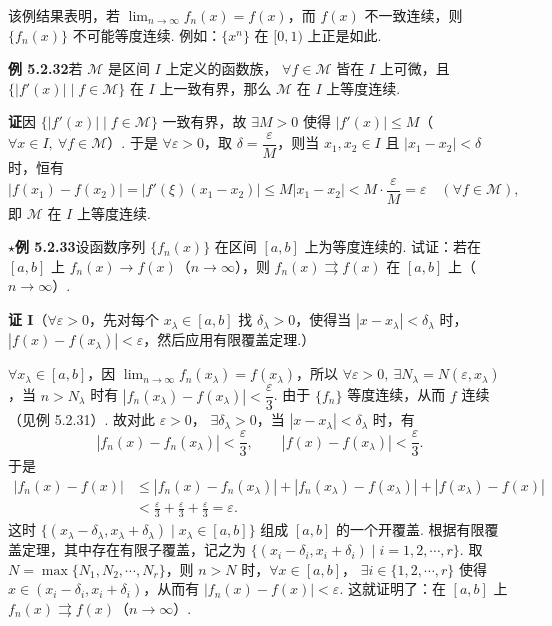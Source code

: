 \documentclass[UTF8,12pt,a4paper,fontset=fandol]{ctexart}
\begin{document}
该例结果表明，若 $\displaystyle\lim_{n\to\infty}f_n(x)=f(x)$，而 $f(x)$ 不一致连续，则
$\{f_n(x)\}$ 不可能等度连续. 例如：$\{x^n\}$ 在 $[0,1)$ 上正是如此.

\noindent\textbf{例 5.2.32}\quad 若 $\mathcal M$ 是区间 $I$ 上定义的函数族，
$\forall f\in\mathcal M$ 皆在 $I$ 上可微，且
$\{|f'(x)|\mid f\in\mathcal M\}$ 在 $I$ 上一致有界，那么 $\mathcal M$ 在 $I$ 上等度连续.

\noindent\textbf{证}\quad 因 $\{|f'(x)|\mid f\in\mathcal M\}$ 一致有界，故
$\exists M>0$ 使得 $|f'(x)|\le M$（$\forall x\in I,\ \forall f\in\mathcal M$）. 于是
$\forall\varepsilon>0$，取 $\delta=\dfrac\varepsilon M$，则当
$x_1,x_2\in I$ 且 $|x_1-x_2|<\delta$ 时，恒有
\[
  |f(x_1)-f(x_2)|=|f'(\xi)(x_1-x_2)|
  \le M|x_1-x_2|<M\cdot\frac\varepsilon M=\varepsilon\quad(\forall f\in\mathcal M),
\]
即 $\mathcal M$ 在 $I$ 上等度连续.

\noindent\textbf{$\star$例 5.2.33}\quad 设函数序列 $\{f_n(x)\}$ 在区间 $[a,b]$ 上为等度连续的. 试证：若在
$[a,b]$ 上 $f_n(x)\to f(x)$（$n\to\infty$），则
$f_n(x)\rightrightarrows f(x)$ 在 $[a,b]$ 上（$n\to\infty$）.

\noindent\textbf{证 I}\quad （$\forall\varepsilon>0$，先对每个 $x_\lambda\in[a,b]$ 找
$\delta_\lambda>0$，使得当 $|x-x_\lambda|<\delta_\lambda$ 时，
$|f(x)-f(x_\lambda)|<\varepsilon$，然后应用有限覆盖定理.）

$\forall x_\lambda\in[a,b]$，因 $\displaystyle\lim_{n\to\infty}f_n(x_\lambda)=f(x_\lambda)$，所以
$\forall\varepsilon>0,\ \exists N_\lambda=N(\varepsilon,x_\lambda)$，当
$n>N_\lambda$ 时有 $|f_n(x_\lambda)-f(x_\lambda)|<\dfrac\varepsilon3$. 由于
$\{f_n\}$ 等度连续，从而 $f$ 连续（见例 5.2.31）. 故对此 $\varepsilon>0$，
$\exists\delta_\lambda>0$，当 $|x-x_\lambda|<\delta_\lambda$ 时，有
\[
  |f_n(x)-f_n(x_\lambda)|<\frac\varepsilon3,\qquad
  |f(x)-f(x_\lambda)|<\frac\varepsilon3.
\]
于是
\[
\begin{aligned}
  |f_n(x)-f(x)|
  &\le |f_n(x)-f_n(x_\lambda)|
    +|f_n(x_\lambda)-f(x_\lambda)|+|f(x_\lambda)-f(x)|\\
  &<\frac\varepsilon3+\frac\varepsilon3+\frac\varepsilon3=\varepsilon.
\end{aligned}
\]
这时 $\{(x_\lambda-\delta_\lambda,x_\lambda+\delta_\lambda)\mid x_\lambda\in[a,b]\}$
组成 $[a,b]$ 的一个开覆盖. 根据有限覆盖定理，其中存在有限子覆盖，记之为
$\{(x_i-\delta_i,x_i+\delta_i)\mid i=1,2,\cdots,r\}$. 取
$N=\max\{N_1,N_2,\cdots,N_r\}$，则 $n>N$ 时，$\forall x\in[a,b]$，
$\exists i\in\{1,2,\cdots,r\}$ 使得 $x\in(x_i-\delta_i,x_i+\delta_i)$，从而有
$|f_n(x)-f(x)|<\varepsilon$. 这就证明了：在 $[a,b]$ 上
$f_n(x)\rightrightarrows f(x)$（$n\to\infty$）.
\end{document}
